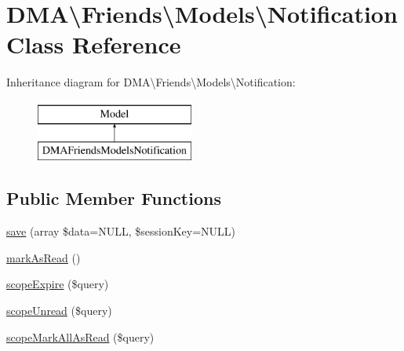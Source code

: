 \hypertarget{classDMA_1_1Friends_1_1Models_1_1Notification}{}\section{D\+M\+A\textbackslash{}Friends\textbackslash{}Models\textbackslash{}Notification Class Reference}
\label{classDMA_1_1Friends_1_1Models_1_1Notification}
Inheritance diagram for D\+M\+A\textbackslash{}Friends\textbackslash{}Models\textbackslash{}Notification\+:\begin{figure}[H]
\begin{center}
\leavevmode
\includegraphics[height=2.000000cm]{de/d7f/classDMA_1_1Friends_1_1Models_1_1Notification}
\end{center}
\end{figure}
\subsection*{Public Member Functions}
\begin{DoxyCompactItemize}
\item 
\hyperlink{classDMA_1_1Friends_1_1Models_1_1Notification_a221608de6df08ac2cab3b145410bc012}{save} (array \$data=N\+U\+L\+L, \$session\+Key=N\+U\+L\+L)
\item 
\hyperlink{classDMA_1_1Friends_1_1Models_1_1Notification_a8618793fa0a9030d6cbfae08a3b74803}{mark\+As\+Read} ()
\item 
\hyperlink{classDMA_1_1Friends_1_1Models_1_1Notification_a547f0a3264c192e47c48f54d7b42c5a5}{scope\+Expire} (\$query)
\item 
\hyperlink{classDMA_1_1Friends_1_1Models_1_1Notification_a92a7c07cfcd4bcb202edb6969fc8c309}{scope\+Unread} (\$query)
\item 
\hyperlink{classDMA_1_1Friends_1_1Models_1_1Notification_a9dd9e4ffa1c0a4047556cd25bcfa0a5a}{scope\+Mark\+All\+As\+Read} (\$query)
\end{DoxyCompactItemize}
